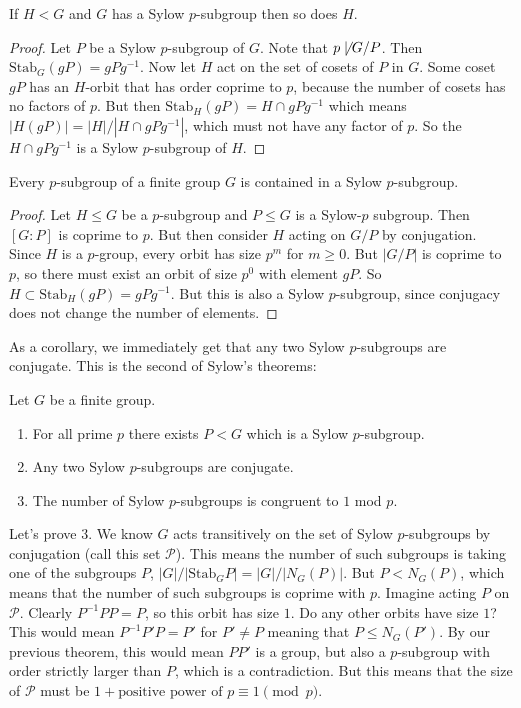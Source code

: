 \begin{lemma}
    If $H < G$ and $G$ has a Sylow $p$-subgroup then so does $H$.
    \begin{proof}
        Let $P$ be a Sylow $p$-subgroup of $G$. Note that $p \not \mid G/P$. Then $\text{Stab}_G(g P) = gPg^{-1}$.
        Now let $H$ act on the set of cosets of $P$ in $G$. Some coset $gP$ has an $H$-orbit
        that has order coprime to $p$, because the number of cosets has no factors of $p$. But then $\text{Stab}_H(gP) = H \cap gPg^{-1}$
        which means $|H(gP)| = |H|/|H \cap gPg^{-1}|$, which must not have any factor of $p$. So the $H \cap gPg^{-1}$ is a Sylow $p$-subgroup of $H$.
    \end{proof}
\end{lemma}

\begin{theorem}
Every $p$-subgroup of a finite group $G$ is contained in a Sylow $p$-subgroup.
\begin{proof}
    Let $H \le G$ be a $p$-subgroup and $P \le G$ is a Sylow-$p$ subgroup.
    Then $[G: P]$ is coprime to $p$. But then consider $H$ acting on $G/P$ by conjugation.
    Since $H$ is a $p$-group, every orbit has size $p^m$ for $m \ge 0$. But $|G/P|$
    is coprime to $p$, so there must exist an orbit of size $p^0$ with element $gP$. So $H \subset \text{Stab}_H (gP) = gPg^{-1}$.
    But this is also a Sylow $p$-subgroup, since conjugacy does not change the number of elements.
\end{proof}
\end{theorem}

As a corollary, we immediately get that any two Sylow $p$-subgroups are conjugate. This is the second of Sylow's theorems:
\begin{theorem}
    Let $G$ be a finite group.
    \begin{enumerate}
        \item For all prime $p$ there exists $P < G$ which is a Sylow $p$-subgroup.
        \item Any two Sylow $p$-subgroups are conjugate.
        \item The number of Sylow $p$-subgroups is congruent to $1$ mod $p$.
    \end{enumerate}
\end{theorem}

Let's prove 3. We know $G$ acts transitively on 
the set of Sylow $p$-subgroups by conjugation (call this set $\mathcal{P}$).
This means the number of such subgroups is 
taking one of the subgroups $P$, $|G|/|\text{Stab}_G P| = |G|/|N_G(P)|$.
But $P < N_G(P)$, which means that the 
number of such subgroups is coprime with $p$. Imagine acting $P$
on $\mathcal{P}$. Clearly $P^{-1} P P = P$, so 
this orbit has size $1$. Do any other orbits have size $1$?
This would mean $P^{-1} P' P = P'$ for $P' \neq P$ meaning that $P \le N_G(P')$. 
By our previous theorem, this would mean $P P'$ is a
group, but also a $p$-subgroup with order 
strictly larger than $P$, which is a contradiction.
But this means that the size of $\mathcal{P}$ must be $1 + \text{positive power of } p \equiv 1 \pmod{p}$.

